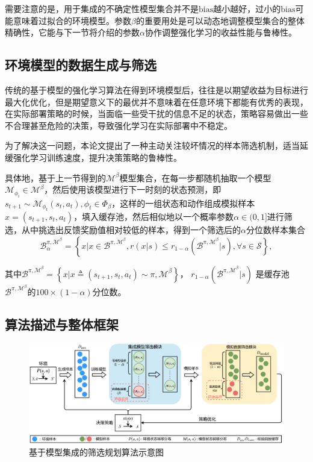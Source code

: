 需要注意的是，用于集成的不确定性模型集合并不是$\mathrm{bias}$越小越好，过小的$\mathrm{bias}$可能意味着过拟合的环境模型。参数$\beta$的重要用处是可以动态地调整模型集合的整体精确性，它能与下一节将介绍的参数$\alpha$协作调整强化学习的收益性能与鲁棒性。

\subsection{环境模型的数据生成与筛选}\label{sec:rollout-method}

传统的基于模型的强化学习算法在得到环境模型后，往往是以期望收益为目标进行最大化优化，但是期望意义下的最优并不意味着在任意环境下都能有优秀的表现，在实际部署策略的时候，当面临一些受干扰的信息不足的状态，策略容易做出一些不合理甚至危险的决策，导致强化学习在实际部署中不稳定。

为了解决这一问题，本论文提出了一种主动关注较坏情况的样本筛选机制，适当延缓强化学习训练速度，提升决策策略的鲁棒性。

具体地，基于上一节得到的$\mathcal{M}^{\beta}$模型集合，在每一步都随机抽取一个模型$\mathcal{M}_{\phi_i}\in\mathcal{M}^\beta$，然后使用该模型进行下一时刻的状态预测，即$s_{t+1}\sim \mathcal{M}_{\phi_t}(s_t,a_t), \phi_t\in\Phi_\beta$，这样的一组状态和动作组成模拟样本$x=\left(s_{t+1},s_t,a_t\right)$，填入缓存池，然后相似地以一个概率参数$\alpha\in(0,1]$进行筛选，从中挑选出反馈奖励值相对较低的样本，得到一个筛选后的$\alpha$分位数样本集合
\begin{equation}\label{def:batch-alpha-beta}
    \mathcal{B}_\alpha^{\pi,\mathcal{M}^\beta}=\left\{x|x\in\mathcal{B}^{\pi,\mathcal{M}^\beta},r(x|s)\leq r_{1-\alpha}(\mathcal{B}^{\pi,\mathcal{M}^\beta}|s), \forall s \in \mathcal{S}\right\},
\end{equation}

其中$\mathcal{B}^{\pi,\mathcal{M}^\beta}=\left\{x|x\triangleq\left(s_{t+1},s_t,a_t\right)\sim\pi,\mathcal{M}^\beta\right\}$， $r_{1-\alpha}(\mathcal{B}^{\pi,\mathcal{M}^\beta}|s)$ 是缓存池 $\mathcal{B}^{\pi,\mathcal{M}^\beta}$的$100\times(1-\alpha)$分位数。

\subsection{算法描述与整体框架}

\begin{figure}[t]
\centering
\includegraphics[width=\textwidth]{figures/mbdp.pdf}
\caption{基于模型集成的筛选规划算法示意图}
\label{fig:mbdp-structure}
\end{figure}

